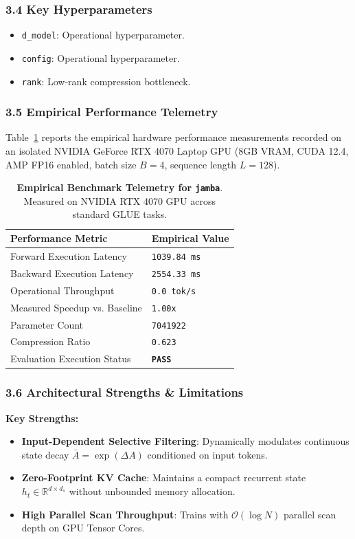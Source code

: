 \subsubsection*{3.4 Key Hyperparameters}
\begin{itemize}
    \item \texttt{d\_model}: Operational hyperparameter.
    \item \texttt{config}: Operational hyperparameter.
    \item \texttt{rank}: Low-rank compression bottleneck.
\end{itemize}

\subsubsection*{3.5 Empirical Performance Telemetry}
Table~\ref{tab:telemetry_jamba} reports the empirical hardware performance measurements recorded on an isolated NVIDIA GeForce RTX 4070 Laptop GPU (8GB VRAM, CUDA 12.4, AMP FP16 enabled, batch size $B=4$, sequence length $L=128$).

\begin{table}[h]
\centering
\small
\caption{\textbf{Empirical Benchmark Telemetry for \texttt{jamba}}. Measured on NVIDIA RTX 4070 GPU across standard GLUE tasks.}
\label{tab:telemetry_jamba}
\begin{tabularx}{\columnwidth}{lX}
\toprule
\textbf{Performance Metric} & \textbf{Empirical Value} \\
\midrule
Forward Execution Latency & \texttt{1039.84 ms} \\
Backward Execution Latency & \texttt{2554.33 ms} \\
Operational Throughput & \texttt{0.0 tok/s} \\
Measured Speedup vs. Baseline & \texttt{1.00x} \\
Parameter Count & \texttt{7041922} \\
Compression Ratio & \texttt{0.623} \\
Evaluation Execution Status & \textbf{\texttt{PASS}} \\
\bottomrule
\end{tabularx}
\end{table}

\subsubsection*{3.6 Architectural Strengths \& Limitations}
\textbf{Key Strengths:}
\begin{itemize}
    \item \textbf{Input-Dependent Selective Filtering}: Dynamically modulates continuous state decay $\bar{A} = \exp(\Delta A)$ conditioned on input tokens.
    \item \textbf{Zero-Footprint KV Cache}: Maintains a compact recurrent state $h_t \in \mathbb{R}^{d \times d_s}$ without unbounded memory allocation.
    \item \textbf{High Parallel Scan Throughput}: Trains with $\mathcal{O}(\log N)$ parallel scan depth on GPU Tensor Cores.
\end{itemize}

